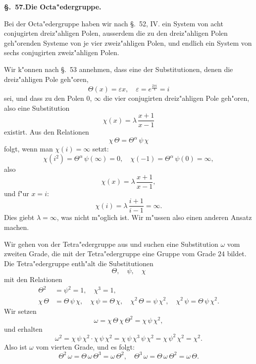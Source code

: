\documentclass[12pt,a4paper]{article}
\theoremstyle{definition}
\begin{document}
\noindent\textbf{\S.~57.}\quad\textbf{Die Octa"edergruppe.}
\vspace{0.3cm}

Bei der Octa"edergruppe haben wir nach \S.~52, IV. ein System von acht conjugirten dreiz"ahligen Polen, ausserdem die zu den dreiz"ahligen Polen geh"orenden Systeme von je vier zweiz"ahligen Polen, und endlich ein System von sechs conjugirten zweiz"ahligen Polen.

Wir k"onnen nach \S.~53 annehmen, dass eine der Substitutionen, denen die dreiz"ahligen Pole geh"oren,
\begin{equation}\label{eq:57-1}
\Theta(x) = \varepsilon x, \quad \varepsilon = e^{\frac{2\pi i}{4}} = i
\end{equation}
sei, und dass zu den Polen $0$, $\infty$ die vier conjugirten dreiz"ahligen Pole geh"oren, also eine Substitution
\begin{equation}\label{eq:57-2}
\chi(x) = \lambda\,\frac{x + 1}{x - 1}
\end{equation}
existirt. Aus den Relationen
\[
\chi\,\Theta = \Theta^\alpha\,\psi\,\chi
\]
folgt, wenn man $\chi(i) = \infty$ setzt:
\[
\chi(i^2) = \Theta^\alpha\,\psi(\infty) = 0, \quad \chi(-1) = \Theta^\alpha\,\psi(0) = \infty,
\]
also
\[
\chi(x) = \lambda\,\frac{x + 1}{x - 1},
\]
und f"ur $x = i$:
\[
\chi(i) = \lambda\,\frac{i + 1}{i - 1} = \infty.
\]
Dies giebt $\lambda = \infty$, was nicht m"oglich ist. Wir m"ussen also einen anderen Ansatz machen.

Wir gehen von der Tetra"edergruppe aus und suchen eine Substitution $\omega$ vom zweiten Grade, die mit der Tetra"edergruppe eine Gruppe vom Grade $24$ bildet. Die Tetra"edergruppe enth"alt die Substitutionen
\[
\Theta, \quad \psi, \quad \chi
\]
mit den Relationen
\begin{equation}\label{eq:57-11}
\begin{aligned}
\Theta^2 &= \psi^2 = 1, \quad \chi^3 = 1, \\
\chi\,\Theta &= \Theta\,\psi\,\chi, \quad \chi\,\psi = \Theta\,\chi, \quad \chi^2\,\Theta = \psi\,\chi^2, \quad \chi^2\,\psi = \Theta\,\psi\,\chi^2.
\end{aligned}
\end{equation}
Wir setzen
\begin{equation}\label{eq:57-10}
\omega = \chi\,\Theta\,\chi\,\Theta^2 = \chi\,\psi\,\chi^2,
\end{equation}
und erhalten
\[
\omega^2 = \chi\,\psi\,\chi^2 \cdot \chi\,\psi\,\chi^2 = \chi\,\psi\,\chi^3\,\psi\,\chi^2 = \chi\,\psi^2\,\chi^2 = \chi^2.
\]
Also ist $\omega$ vom vierten Grade, und es folgt:
\[
\Theta^2\,\omega = \Theta\,\omega\,\Theta^3 = \omega\,\Theta^2, \quad \Theta^3\,\omega = \Theta\,\omega\,\Theta^2 = \omega\,\Theta.
\]
\end{document}
